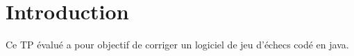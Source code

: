 \chapter{Introduction}
Ce TP évalué a pour objectif  de corriger un logiciel de jeu d'échecs codé en java.  

